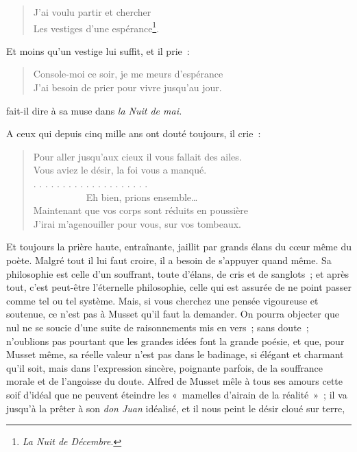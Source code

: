 \documentclass[french,twoside]{book} %
\begin{document}
\begin{verse}
J’ai voulu partir et chercher\\
Les vestiges d’une espérance\footnote{\emph{La Nuit de Décembre}.}.\\
\end{verse}

\noindent Et moins qu’un vestige lui suffit, et il prie :\par


\begin{verse}
Console-moi ce soir, je me meurs d’espérance\\
J’ai besoin de prier pour vivre jusqu’au jour.\\
\end{verse}

\noindent fait-il dire à sa muse dans \emph{la Nuit de mai.}\par
A ceux qui depuis cinq mille ans ont douté toujours, il crie :\par


\begin{verse}
Pour aller jusqu’aux cieux il vous fallait des ailes.\\
Vous aviez le désir, la foi vous a manqué.\\
. . . . . . . . . . . . . . . . . . . .\\
           Eh bien, prions ensemble…\\
Maintenant que vos corps sont réduits en poussière\\
J’irai m’agenouiller pour vous, sur vos tombeaux.\\
\end{verse}

\noindent Et toujours la prière haute, entraînante, jaillit par grands élans du cœur même du poète. Malgré tout il lui faut croire, il a besoin de s’appuyer quand même. Sa philosophie est celle d’un souffrant, toute d’élans, de cris et de sanglots ; et après tout, c’est peut-être l’éternelle philosophie, celle qui est assurée de ne point passer comme tel ou tel système. Mais, si vous cherchez une pensée vigoureuse et soutenue, ce n’est pas à Musset qu’il faut la demander. On pourra objecter que nul ne se soucie d’une suite de raisonnements mis en vers ; sans doute ; n’oublions pas pourtant que les grandes idées font la grande poésie, et que, pour Musset même, sa réelle valeur n’est pas dans le badinage, si élégant et charmant qu’il soit, mais dans l’expression sincère, poignante parfois, de la souffrance morale et de l’angoisse du doute. Alfred de Musset mêle à tous ses amours cette soif d’idéal que ne peuvent éteindre les « mamelles d’airain de la réalité » ; il va jusqu’à la prêter à son \emph{don Juan} idéalisé, et il nous peint le désir cloué sur terre,\par
\end{document}
